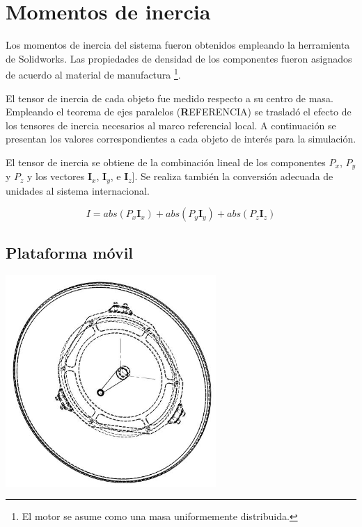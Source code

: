 \section{Momentos de inercia}

Los momentos de inercia del sistema fueron obtenidos
empleando la herramienta de Solidworks. 
Las propiedades de densidad de los componentes 
fueron asignados de acuerdo al material de manufactura
\footnote{El motor se asume como una masa uniformemente distribuida.}.

El tensor de inercia de cada objeto fue medido respecto a su centro de masa.
Empleando el teorema de ejes paralelos (\textbf REFERENCIA) se trasladó el efecto de los tensores de inercia necesarios al marco referencial local.
A continuación se presentan los valores correspondientes a cada objeto de interés para la simulación.

El tensor de inercia se obtiene de la combinación lineal 
de los componentes $P_x$, $P_y$ y $P_z$ y los vectores $\mathbf I_x$, $\mathbf I_y$, e $\mathbf I_z]$.
Se realiza también la conversión adecuada de unidades al
sistema internacional.

\begin{equation*}
 I = abs(P_x \mathbf I_x) + abs(P_y \mathbf I_y) +abs(P_z \mathbf I_z)
\end{equation*}

\subsection{Plataforma móvil}
\includegraphics[width=8cm]{03_Reporte/img/plat_D.JPG}

% 

